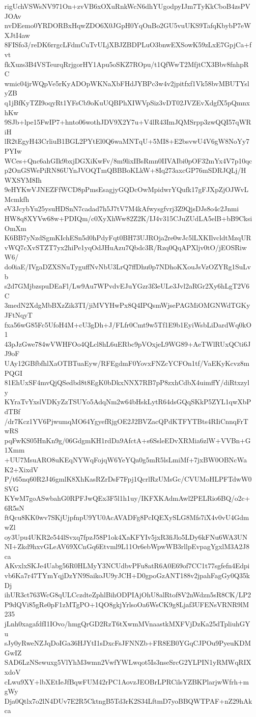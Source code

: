 rigUchVSWsNV971On+zvVB6xOXuRnkWcN6dhYUgodpyIJm7TyKkCboB4zsPVJOAv
nvDEemo0YRDORBxHqwZDO6X0JGpH0YqOnBo2GU5vuUKS9TafqKbybP7eWXJtI4aw
8FISfo3/reDK6rrgcLFdmCuTvULjXBJZBDPLuO3bnwEXSowK59zLxE7GpjCa+fvt
fkXuzs3B4VSTeurqRrjgorHY1Apu5oSKZ7ROpu/t1QfWwT2MfjtCX3Bbv8fnhpRC
wmic04jrWQpVe5rKyADOpWKNaXbFHdJYBPc3w4v2jpitfxf1Vk58bvMBUTYslyZB
q1jBfKyTZI9oqyRt1YFsCb9oKuUQBPhXIWVpSiz3vDT02JVZEvXdgfX5pQmnxhKw
9SJb+lpe15FwIP7+hnto06wothJDV9X2Y7u+V4lR43ImJQMSrpp3zwQQI57qWRiH
lR2tEgyH43CrliuB1BGL2PYtEl0Q6waMNTqU+5MI8+E2bsvwU4V6gW8NoYy7PYIw
WCes+Qnc6ahGIk9bxjDGXiKwFv/8m9lixIBsRmn0IIVAIbi0pOF32mYx4V7p10qc
p2OnGSWePiRN86UYnJVOQTmQBBBoKLkW+8Iq273axcGP76mSDRJQLj/HWXSYM8Ih
9eHYKwVJNEZFfWCD8pPmsEsagjyGQDcOwMpidwrYQufk17gFJXpZjOJWvLMcmkfh
eV3JcybYu25ysuHDSnN7cadad7h5J7tV7M4kAfwysgfvrj3Z9QjsDJs8o4c2Jnmi
HW8q8XYVw68w+PDIQm/c0XyXhWw82Z2K/IJ4v315CJuZUdLA5elB+bB9CksiOmXm
K6BB7yNzdSgmKIchESn5d0hPdyFqt0BH73UJROja2re0wJc5lLXKIlvcldtMzqUR
vWQ7cXvSTZT7yx2hiPe1yqOdJHuAzu7Qbdc3R/Rzq0QqAPXljv0tO/jEOSRiwW6/
do0iaE/IVgaDZXSNuTyguffNvNbU3LrQ7ffDhu0p7NDhoKXouJsVzOZYRg1SuLvb
s2d7GMjbzspuDEaFl/Lw9Au7WPvdvEJuYGzr3f3eULe3Jvl2aRGr2Xy6hLgT2V6C
3medN2XdgMbBXzZik3TI/jiMVYHwPx8Q4IPQsmWjsePAGMiOMGNWdTGKyJFtNqyT
fxa56wG85Fc5UfoH4M+cU3gDh+J/FLfr0Cmt9w5Tf1E9b1EyiWsbLiDardWq0kO1
43pJzGwe784wVWHFOo4QLcl8hL6uERbc9pVOxjeL9WG89+AeTWlRUxQCti6JJ9oF
UAy12GBfbfhlXaOTBTuaEyw/RFEgdmF0YovxFNZcYCFOn1tf/VaEKyKcvz8mPQGI
81EhUxSF4mvQjQSedbd8t8EgK0bDkxNNX7RB7pP8zxhCdbX4uimffY/diRtxzyly
KYraTvYxslVDKyZzTSUYo5AdqNm2w64bHskLytR64dsGQqSKkP5ZYL1qwXbPdTBf
/dr7Kcz1YV6PjwumqMO64YgyefRjgOE2J2BVZacQPdKTFYTBts4RIiCnnqFrTwRS
pqFwKS05HnKn9g/06GdgmKH1rdDa9AfctA+s6SsleEDvXRMia6zlW+VVBn+G1Xmm
+UU7MsuARO8uKEqNYWqFojqW6YeYQa0g5mR5lsLmiMf+7jxBW0OBNcWaK2+XixdV
P/t65nq60R2J46gmlK8XhKasRZrDsF7Fpj1QcrlRzUMsGc/CVUMoHLPFTdwW0SVG
KYwM7goASwbahG0RPFJwQEx3F5l1h1uy/IKFXKAdmAwl2PELRio6BQ/o2c+6R5sN
ftQcu8KK0wv7SKjUjpfnpU9YU0AcAVADFg8PcIQEXySLG8Mfs7iX4v0vU4GdmwZl
oy3Upu4UKR2e544lSvxq7fpzJ58P1ok4XaKFYIv5jxR3fiJlo5LDy6kFNu6WA3UN
NI+Zkd9hxvGLeAV69XCnGq6Etvml9L11Or6ebWpwWB3rllpEvpagYgxlM3A2J8ca
AKvxlxSKJe4Uabg56R0HLMyY3NCUdbvPFu8atR6A0E69of7CC1t77sgfefn4Edpi
vb6Ka7r47TYmYqjDzYN9SaikoJU9yJCH+D0gpoGzANT188v2jpahFagGy0Q35kDj
ihUR3ct763WcG8qULCczdteZphlBihODPIAjOhU8alRtof8V2nWdzn5sR8CK/LP2
P9dQVi85gRe0pF1zMTgPO+1QO8gkjYrlsoOa6WsCK9g8Ljaf3UFENsVRNR9lM235
jLnh0xagafdfI1IOvo/hmgQrGD2RzT6tXwmMVnaastkMXFVjDzKa25dTpliuhGYu
sJy0yRweNZJqDoIGa36HJYtI1sDxcFsJFNNZb+FR8EB0YGqCJPOu9PyeuKDMGwIZ
SAD6LzNSewuxg5VlYhM3wmn2VwfYWLwqot5Is3nseSrcG2YLPIN1yRMWqRIXxdoV
cLwu9XY+lbXEtIeJfBqwFUM42rPC1AovzJEOBrLPRCilsYZBKPlarjwWfrh+mgWy
Dja0Qtlx7o2lN4DUv7E2R5CktngB5Td3rK2S34LftmD7yoBBQWTPAF+nZ29hAkca
